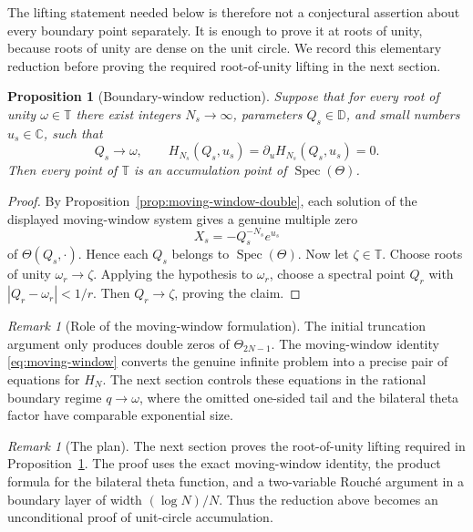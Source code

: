 \documentclass[11pt,a4paper,reqno]{amsart}
\newtheorem{proposition}[theorem]{Proposition}
\theoremstyle{remark}
\newtheorem{remark}[theorem]{Remark}
\newcommand{\C}{\mathbb C}
\newcommand{\D}{\mathbb D}
\newcommand{\T}{\mathbb T}
\newcommand{\Spec}{\operatorname{Spec}}
\begin{document}
The lifting statement needed below is therefore not a conjectural assertion about every boundary point separately.  It is enough to prove it at roots of unity, because roots of unity are dense on the unit circle.  We record this elementary reduction before proving the required root-of-unity lifting in the next section.

\begin{proposition}[Boundary-window reduction]\label{prop:boundary-window-reduction}
Suppose that for every root of unity \(\omega\in\T\) there exist integers \(N_s\to\infty\), parameters \(Q_s\in\D\), and small numbers \(u_s\in\C\), such that
\[
        Q_s\to\omega,
        \qquad
        H_{N_s}(Q_s,u_s)=\partial_uH_{N_s}(Q_s,u_s)=0.
\]
Then every point of \(\T\) is an accumulation point of \(\Spec(\Theta)\).
\end{proposition}

\begin{proof}
By Proposition~\ref{prop:moving-window-double}, each solution of the displayed moving-window system gives a genuine multiple zero
\[
        X_s=-Q_s^{-N_s}e^{u_s}
\]
of \(\Theta(Q_s,\cdot)\).  Hence each \(Q_s\) belongs to \(\Spec(\Theta)\).  Now let \(\zeta\in\T\).  Choose roots of unity \(\omega_r\to\zeta\).  Applying the hypothesis to \(\omega_r\), choose a spectral point \(Q_r\) with \(|Q_r-\omega_r|<1/r\).  Then \(Q_r\to\zeta\), proving the claim.
\end{proof}

\begin{remark}[Role of the moving-window formulation]
The initial truncation argument only produces double zeros of \(\Theta_{2N-1}\).  The moving-window identity \eqref{eq:moving-window} converts the genuine infinite problem into a precise pair of equations for \(H_N\).  The next section controls these equations in the rational boundary regime \(q\to\omega\), where the omitted one-sided tail and the bilateral theta factor have comparable exponential size.
\end{remark}


\begin{remark}[The plan]
The next section proves the root-of-unity lifting required in Proposition~\ref{prop:boundary-window-reduction}.  The proof uses the exact moving-window identity, the product formula for the bilateral theta function, and a two-variable Rouch\'e argument in a boundary layer of width $(\log N)/N$.  Thus the reduction above becomes an unconditional proof of unit-circle accumulation.
\end{remark}
\end{document}
